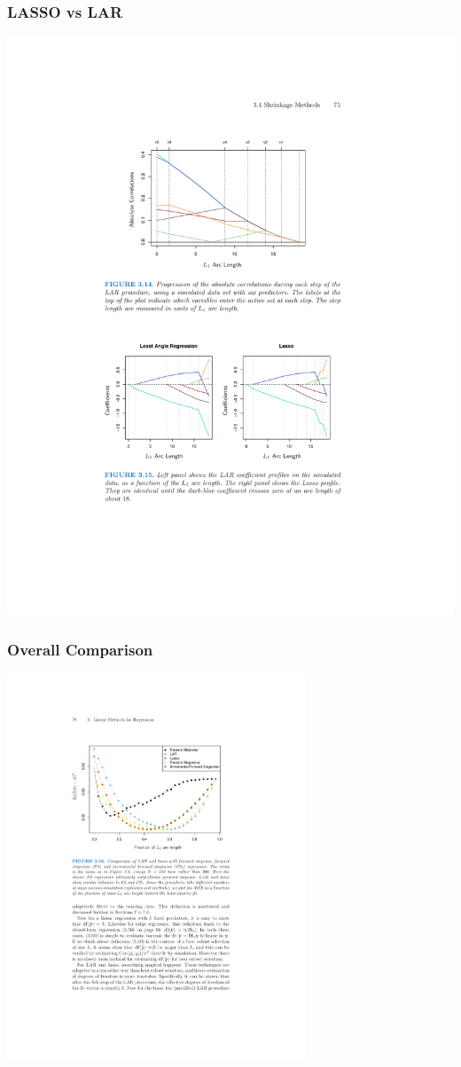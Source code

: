 \begin{frame}
\frametitle{LASSO vs LAR}
\begin{center}
\includegraphics[width=\textwidth]{./resources/lar-lasso}
\end{center}
\end{frame}

\begin{frame}
\frametitle{Overall Comparison}
\begin{center}
\includegraphics[width=3.5in]{./resources/compareall}
\end{center}
\end{frame}

